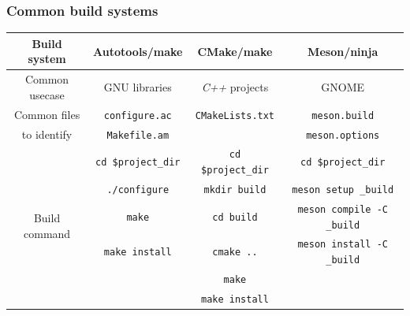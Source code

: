 \begin{frame}
    \frametitle{Common build systems}

    \begin{center}
        \footnotesize
        \begin{tabular}{ c | c c c }
            \hline
            Build system & Autotools/make & CMake/make & Meson/ninja \\
            \hline
            Common usecase & GNU libraries & \textit{C++} projects & GNOME \\
            \hline
            Common files & \texttt{configure.ac} & \texttt{CMakeLists.txt} & \texttt{meson.build} \\
            to identify & \texttt{Makefile.am} & & \texttt{meson.options} \\
            \hline
            \multirow[t]{6}{*}{Build command} & \scriptsize\texttt{cd \$project\_dir} & \scriptsize\texttt{cd \$project\_dir} & \scriptsize\texttt{cd \$project\_dir} \\
            & \scriptsize\texttt{./configure} & \scriptsize\texttt{mkdir build} & \scriptsize\texttt{meson setup \_build} \\
            & \scriptsize\texttt{make} & \scriptsize\texttt{cd build} & \scriptsize\texttt{meson compile -C \_build} \\
            & \scriptsize\texttt{make install} & \scriptsize\texttt{cmake ..} & \scriptsize\texttt{meson install -C \_build} \\
            & & \scriptsize\texttt{make} & \\
            & & \scriptsize\texttt{make install} & \\
            \hline
        \end{tabular}
    \end{center}
\end{frame}
